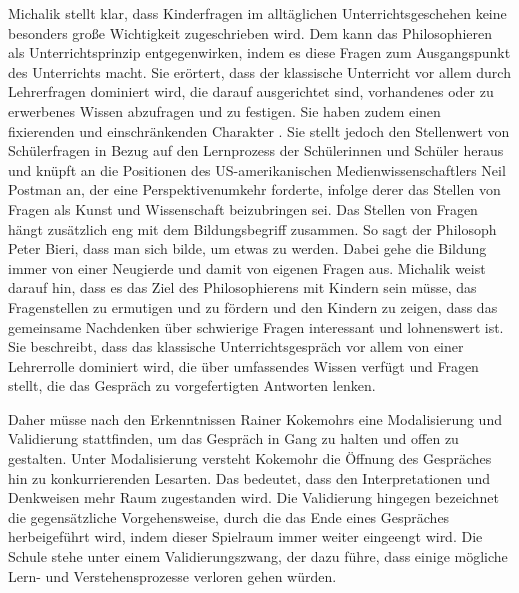 Michalik stellt klar, dass Kinderfragen im alltäglichen Unterrichtsgeschehen keine besonders große Wichtigkeit zugeschrieben wird. 
Dem kann das Philosophieren als Unterrichtsprinzip entgegenwirken, indem es diese Fragen zum Ausgangspunkt des Unterrichts macht. 
Sie erörtert, dass der klassische Unterricht vor allem durch Lehrerfragen dominiert wird, die darauf ausgerichtet sind, vorhandenes oder zu erwerbenes Wissen abzufragen und zu festigen. 
Sie haben zudem einen \glqq fixierenden und einschränkenden Charakter\grqq{} \cite[S.\,635]{KM13}. 
Sie stellt jedoch den Stellenwert von Schülerfragen in Bezug auf den Lernprozess der Schülerinnen und Schüler heraus und knüpft an die Positionen des US-amerikanischen Medienwissenschaftlers Neil Postman an, der eine Perspektivenumkehr forderte, infolge derer das Stellen von Fragen als \glqq Kunst und Wissenschaft beizubringen\grqq{} \cite[S.\,636]{KM13} sei. 
Das Stellen von Fragen hängt zusätzlich eng mit dem Bildungsbegriff zusammen. 
So sagt der Philosoph Peter Bieri, dass man sich bilde, um etwas zu werden. 
Dabei gehe die Bildung immer von einer Neugierde und damit von eigenen Fragen aus.
Michalik weist darauf hin, dass es das Ziel des Philosophierens mit Kindern sein müsse, \glqq das Fragenstellen zu ermutigen und zu fördern und den Kindern zu zeigen, dass das gemeinsame Nachdenken über schwierige Fragen interessant und lohnenswert ist.\grqq{} \cite[S.\,637]{KM13}
Sie beschreibt, dass das klassische Unterrichtsgespräch vor allem von einer Lehrerrolle dominiert wird, die über umfassendes Wissen verfügt und Fragen stellt, die das Gespräch zu vorgefertigten Antworten lenken.

Daher müsse nach den Erkenntnissen Rainer Kokemohrs eine Modalisierung und Validierung stattfinden, um das Gespräch in Gang zu halten und offen zu gestalten.
Unter Modalisierung versteht Kokemohr \glqq die Öffnung des Gespräches hin zu konkurrierenden Lesarten.\grqq{} \cite[S.\,637]{KM13}
Das bedeutet, dass den Interpretationen und Denkweisen mehr Raum zugestanden wird.
Die Validierung hingegen bezeichnet die gegensätzliche Vorgehensweise, durch die das Ende eines Gespräches herbeigeführt wird, indem dieser Spielraum immer weiter eingeengt wird.
Die Schule stehe unter einem Validierungszwang, der dazu führe, dass einige mögliche Lern- und Verstehensprozesse verloren gehen würden.
 
